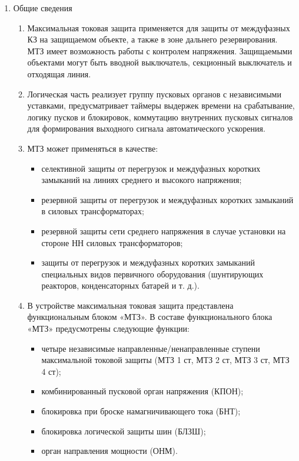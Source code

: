 
\color{black}

\begin{enumerate}

\item Общие сведения

\begin{enumerate}

\item
Максимальная токовая защита применяется для защиты от междуфазных КЗ на защищаемом объекте, а также в зоне дальнего резервирования. МТЗ имеет возможность работы с контролем напряжения. Защищаемыми объектами могут быть вводной выключатель, секционный выключатель и отходящая линия.

\item
Логическая часть реализует группу пусковых органов с независимыми уставками, предусматривает таймеры выдержек времени на срабатывание, логику пусков и блокировок, коммутацию внутренних пусковых сигналов для формирования выходного сигнала автоматического ускорения.

\item
МТЗ может применяться в качестве:
\begin{itemize}
    \item селективной защиты от перегрузок и междуфазных коротких замыканий на линиях среднего и высокого напряжения;
    \item резервной защиты от перегрузок и междуфазных коротких замыканий в силовых трансформаторах;
    \item резервной защиты сети среднего напряжения в случае установки на стороне НН силовых трансформаторов;
    \item защиты от перегрузок и междуфазных  коротких замыканий специальных видов первичного оборудования (шунтирующих реакторов, конденсаторных батарей и т. д.).
\end{itemize}

\item 
В устройстве максимальная токовая защита представлена функциональным блоком «МТЗ». В составе функционального блока «МТЗ» предусмотрены следующие функции:
\begin{itemize}
\item четыре независимые направленные/ненаправленные ступени максимальной токовой защиты (МТЗ 1 ст, МТЗ 2 ст, МТЗ 3 ст, МТЗ 4 ст);
\item комбинированный пусковой орган напряжения (КПОН);
\item блокировка при броске намагничивающего тока (БНТ);
\item блокировка логической защиты шин (БЛЗШ);
\item орган направления мощности (ОНМ).
\end{itemize}


\end{enumerate}
\end{enumerate}
